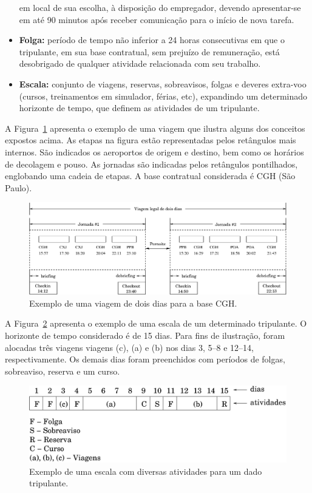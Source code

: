 \documentclass[12pt,a4paper]{article}
\begin{document}
\begin{itemize}
	em local de sua escolha, à disposição do empregador, devendo apresentar-se em até 90 minutos após 
	receber comunicação para o início de nova tarefa.
	\item {\bf Folga:} período de tempo não inferior a 24 horas consecutivas em que o tripulante, em 
	sua base contratual, sem prejuízo de remuneração, está desobrigado de qualquer atividade
	relacionada com seu trabalho.
	\item {\bf Escala:} conjunto de viagens, reservas, sobreavisos, folgas e deveres extra-voo
	(cursos, treinamentos em simulador, férias, etc), expandindo um determinado horizonte de tempo, 
	que definem as atividades de um tripulante. 
\end{itemize}

A Figura~\ref{fig:viagem} apresenta o exemplo de uma viagem que ilustra alguns dos conceitos
expostos acima. As etapas na figura estão representadas pelos retângulos mais internos. São
indicados os aeroportos de origem e destino, bem como os horários de decolagem e pouso. As
jornadas são indicadas pelos retângulos pontilhados, englobando uma cadeia de etapas. A base 
contratual considerada é CGH (São Paulo). 

\begin{figure}[htbp]
	\begin{center}
		\includegraphics[scale=0.5]{fig/viagem.eps}
		\caption{Exemplo de uma viagem de dois dias para a base CGH.}
		\label{fig:viagem}
	\end{center}
\end{figure}

A Figura~\ref{fig:escala} apresenta o exemplo de uma escala de um determinado tripulante. O 
horizonte de tempo considerado é de 15 dias. Para fins de ilustração, foram alocadas três 
viagens viagens (c), (a) e (b) nos dias 3, 5--8 e 12--14, respectivamente. Os demais dias foram 
preenchidos com períodos de folgas, sobreaviso, reserva e um curso.

\begin{figure}[htbp]
	\begin{center}
		\includegraphics[scale=0.5]{fig/escala.eps}
		\caption{Exemplo de uma escala com diversas atividades para um dado tripulante.}
		\label{fig:escala}
	\end{center}
\end{figure}
\end{document}
